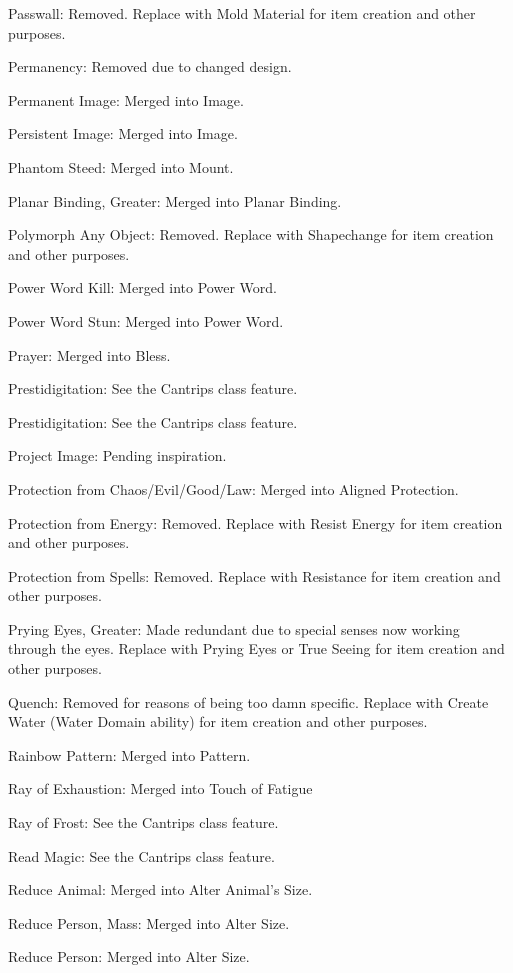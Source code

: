 {\begin{list}{}{\leftmargin=1em}
 \item Passwall: Removed. Replace with Mold Material for item creation and other purposes.
 \item Permanency: Removed due to changed design.
 \item Permanent Image: Merged into Image.
 \item Persistent Image: Merged into Image.
 \item Phantom Steed: Merged into Mount.
 \item Planar Binding, Greater: Merged into Planar Binding.
 \item Polymorph Any Object: Removed. Replace with Shapechange for item creation and other purposes.
 \item Power Word Kill: Merged into Power Word.
 \item Power Word Stun: Merged into Power Word.
 \item Prayer: Merged into Bless.
 \item Prestidigitation: See the Cantrips class feature.
 \item Prestidigitation: See the Cantrips class feature.
 \item Project Image: Pending inspiration.
 \item Protection from Chaos/Evil/Good/Law: Merged into Aligned Protection.
 \item Protection from Energy: Removed. Replace with Resist Energy for item creation and other purposes.
 \item Protection from Spells: Removed. Replace with Resistance for item creation and other purposes.
 \item Prying Eyes, Greater: Made redundant due to special senses now working through the eyes. Replace with Prying Eyes or True Seeing for item creation and other purposes.
 \item Quench: Removed for reasons of being too damn specific. Replace with Create Water (Water Domain ability) for item creation and other purposes.
 \item Rainbow Pattern: Merged into Pattern.
 \item Ray of Exhaustion: Merged into Touch of Fatigue
 \item Ray of Frost: See the Cantrips class feature.
 \item Read Magic: See the Cantrips class feature.
 \item Reduce Animal: Merged into Alter Animal's Size.
 \item Reduce Person, Mass: Merged into Alter Size.
 \item Reduce Person: Merged into Alter Size.

\end{list}}
